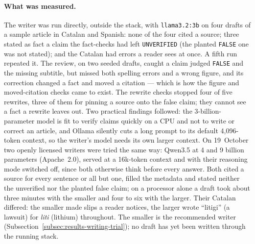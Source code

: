 \paragraph{What was measured.} The writer was run directly, outside the
stack, with \texttt{llama3.2:3b} on four drafts of a sample article in
Catalan and Spanish: none of the four cited a source; three stated as
fact a claim the fact-checks had left \texttt{UNVERIFIED} (the planted
\texttt{FALSE} one was not stated); and the Catalan had errors a reader
sees at once. A fifth run repeated it. The review, on two seeded drafts,
caught a claim judged \texttt{FALSE} and the missing subtitle, but
missed both spelling errors and a wrong figure, and its correction
changed a fact and moved a citation --- which is how the figure and
moved-citation checks came to exist. The rewrite checks stopped four of
five rewrites, three of them for pinning a source onto the false claim;
they cannot see a fact a rewrite leaves out. Two practical findings
followed: the 3-billion-parameter model is fit to verify claims quickly
on a CPU and not to write or correct an article, and Ollama silently
cuts a long prompt to its default 4,096-token context, so the writer's
model needs its own larger context. On 19~October two openly licensed
writers were tried the same way: Qwen3.5 at 4 and 9 billion parameters
(Apache~2.0), served at a 16k-token context and with their reasoning
mode switched off, since both otherwise think before every answer. Both
cited a source for every sentence or all but one, filled the metadata
and stated neither the unverified nor the planted false claim; on a
processor alone a draft took about three minutes with the smaller and
four to six with the larger. Their Catalan differed: the smaller made
slips a reader notices, the larger wrote ``litigi'' (a lawsuit) for
\emph{liti} (lithium) throughout. The smaller is the recommended writer
(Subsection~\ref{subsec:results-writing-trial}); no draft has yet been
written through the running stack.


